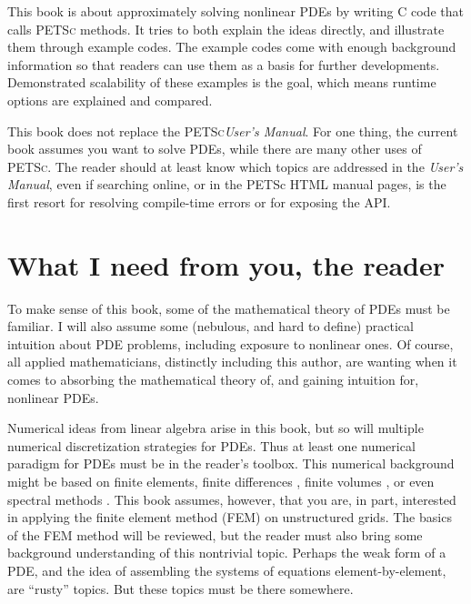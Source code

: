 \documentclass{tufte-book}
\theoremstyle{definition}
\newcommand{\PETSc}{\textsc{PETSc}\xspace}
\begin{document}
This book is about approximately solving nonlinear PDEs by writing C code that calls \PETSc methods.  It tries to both explain the ideas directly, and illustrate them through example codes.  The example codes come with enough background information so that readers can use them as a basis for further developments.  Demonstrated scalability of these examples is the goal, which means runtime options are explained and compared.

This book does not replace the \PETSc \emph{User's Manual}.  For one thing, the current book assumes you want to solve PDEs, while there are many other uses of \PETSc.  The reader should at least know which topics are addressed in the \emph{User's Manual}, even if searching online, or in the PETSc HTML manual pages, is the first resort for resolving compile-time errors or for exposing the API.

\section{What I need from you, the reader}

To make sense of this book, some of the mathematical theory of PDEs must be familiar.  I will also assume some (nebulous, and hard to define) practical intuition about PDE problems, including exposure to nonlinear ones.  Of course, all applied mathematicians, distinctly including this author, are wanting when it comes to absorbing the mathematical theory of, and gaining intuition for, nonlinear PDEs.

Numerical ideas from linear algebra \citep{TrefethenBau} arise in this book, but so will multiple numerical discretization strategies for PDEs.  Thus at least one numerical paradigm for PDEs must be in the reader's toolbox.  This numerical background might be based on finite elements, finite differences \citep{MortonMayers}, finite volumes \citep{LeVeque}, or even spectral methods \citep{KarniadakisSherwin,Trefethen}.  This book assumes, however, that you are, in part, interested in applying the finite element method (FEM) on unstructured grids.  The basics of the FEM method will be reviewed, but the reader must also bring some background understanding of this nontrivial topic.  Perhaps the weak form of a PDE, and the idea of assembling the systems of equations element-by-element, are ``rusty'' topics.  But these topics must be there somewhere.
\end{document}
